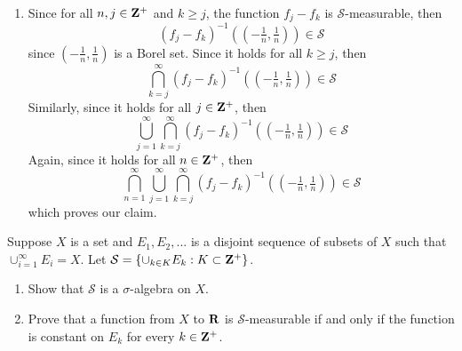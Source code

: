 \begin{solution}
\begin{enumerate}[label = (\alph*)]
        \item Since for all $n,j \in \mathbf{Z}^+$ and $k \geq j$, the function $f_j - f_k$ is $\mathcal{S}$-measurable, then 
        $$(f_j - f_k)^{-1}((-\tfrac{1}{n}, \tfrac{1}{n})) \in \mathcal{S}$$
        since $(-\frac{1}{n}, \frac{1}{n})$ is a Borel set. Since it holds for all $k \geq j$, then 
        $$\bigcap_{k=j}^{\infty}(f_j - f_k)^{-1}((-\tfrac{1}{n}, \tfrac{1}{n})) \in \mathcal{S}$$
        Similarly, since it holds for all $j \in \mathbf{Z}^+$, then
        $$\bigcup_{j=1}^{\infty}\bigcap_{k=j}^{\infty}(f_j - f_k)^{-1}((-\tfrac{1}{n}, \tfrac{1}{n})) \in \mathcal{S}$$
        Again, since it holds for all $n \in \mathbf{Z}^+$, then
        $$\bigcap_{n=1}^{\infty}\bigcup_{j=1}^{\infty}\bigcap_{k=j}^{\infty}(f_j - f_k)^{-1}((-\tfrac{1}{n}, \tfrac{1}{n})) \in \mathcal{S}$$
        which proves our claim. \\
    \end{enumerate}
\end{solution}

\begin{exercise}
    Suppose $X$ is a set and $E_1, E_2, ...$ is a disjoint sequence of subsets of $X$ such that $\cup_{i=1}^{\infty}E_i = X$. Let $\mathcal{S} = \{\cup_{k \in K}E_k : K \subset \mathbf{Z}^+ \}$.
    \begin{enumerate}[label = (\alph*)]
        \item Show that $\mathcal{S}$ is a $\sigma$-algebra on $X$.
        \item Prove that a function from $X$ to $\mathbf{R}$ is $\mathcal{S}$-measurable if and only if the function is constant on $E_k$ for every $k \in \mathbf{Z}^+$.\\
    \end{enumerate}
\end{exercise}

